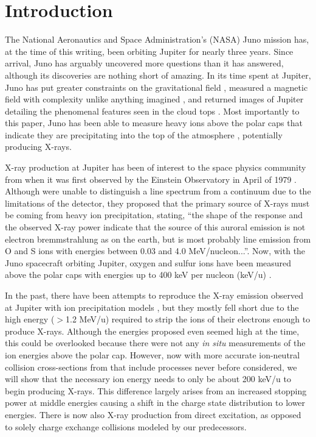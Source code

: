 \documentclass[draft]{agujournal2018}
\begin{document}
%
%

\section{Introduction}

The National Aeronautics and Space Administration's (NASA) Juno mission has, at the time of this writing, been orbiting Jupiter for nearly three years.
Since arrival, Juno has arguably uncovered more questions than it has answered, although its discoveries are nothing short of amazing.
In its time spent at Jupiter, Juno has put greater constraints on the gravitational field \citep{folkner2017,iess2018}, measured a magnetic field with complexity unlike anything imagined \citep{connerney2017,connerney2018,moore2018}, and returned images of Jupiter detailing the phenomenal features seen in the cloud tops \citep{orton2017,sanchez2018}.
Most importantly to this paper, Juno has been able to measure heavy ions above the polar caps that indicate they are precipitating into the top of the atmosphere \citep{haggerty2017,clark2017a,clark2017b}, potentially producing X-rays.

X-ray production at Jupiter has been of interest to the space physics community from when it was first observed by the Einstein Observatory in April of 1979 \citep{metzger1983}.
Although \citet{metzger1983} were unable to distinguish a line spectrum from a continuum due to the limitations of the detector, they proposed that the primary source of X-rays must be coming from heavy ion precipitation, stating, ``the shape of the response and the observed X-ray power indicate that the source of this auroral emission is not electron bremmstrahlung as on the earth, but is most probably line emission from O and S ions with energies between 0.03 and 4.0 MeV/nucleon...''.
Now, with the Juno spacecraft orbiting Jupiter, oxygen and sulfur ions have been measured above the polar caps with energies up to 400 keV per nucleon (keV/u) \citep{haggerty2017,clark2017a,clark2017b}. 

In the past, there have been attempts to reproduce the X-ray emission observed at Jupiter with ion precipitation models \citep{cravens1995,ozak2010,ozak2013}, but they mostly fell short due to the high energy ($>$1.2 MeV/u) required to strip the ions of their electrons enough to produce X-rays.
Although the energies proposed even seemed high at the time, this could be overlooked because there were not any \textit{in situ} measurements of the ion energies above the polar cap.
However, now with more accurate ion-neutral collision cross-sections from \citet{schultz2019} that include processes never before considered, we will show that the necessary ion energy needs to only be about 200 keV/u to begin producing X-rays.
This difference largely arises from an increased stopping power at middle energies causing a shift in the charge state distribution to lower energies.
There is now also X-ray production from direct excitation, as opposed to solely charge exchange collisions modeled by our predecessors.
\end{document}
